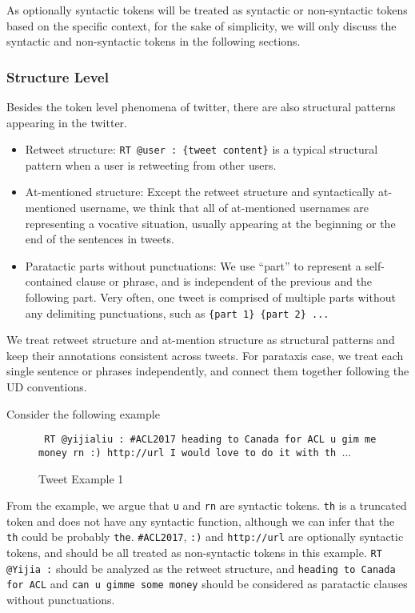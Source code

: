 \documentclass[11pt,letterpaper]{article}
\begin{document}
As optionally syntactic tokens will be treated as syntactic or non-syntactic tokens based on the specific context, for the sake of simplicity, we will only discuss the syntactic and non-syntactic tokens in the following sections.

	
\subsubsection{Structure Level}
Besides the token level phenomena of twitter, there are also structural patterns appearing in the twitter.

\begin{itemize}
\item Retweet structure: {\tt RT @user : \{tweet content\}} is a typical structural pattern when a user is retweeting from other users. 
\item At-mentioned structure: Except the retweet structure and syntactically at-mentioned username, we think that all of at-mentioned usernames are representing a vocative situation, usually appearing at the beginning or the end of the sentences in tweets.
\item Paratactic parts without punctuations: We use ``part'' to represent a self-contained clause or phrase, and is independent of the previous and the following part. Very often, one tweet is comprised of multiple parts without any delimiting punctuations, such as {\tt \{part 1\} \{part 2\} ...}
\end{itemize}

We treat retweet structure and at-mention structure as structural patterns and keep their annotations consistent across tweets. For parataxis case, we treat each single sentence or phrases independently, and connect them together following the UD conventions. 

Consider the following example

\begin{figure}[h]
\label{ex1}
\small
{\tt
RT @yijialiu : \#ACL2017 heading to Canada for ACL u gim me money rn :) http://url I would love to do it with th $\ldots$ %
}
\caption{Tweet Example 1}
\label{ex1}
\end{figure}

From the example, we argue that {\tt u} and {\tt rn} are syntactic tokens.
{\tt th} is a truncated token and does not have any syntactic function, although we can infer that the {\tt th} could be probably {\tt the}.
{\tt \#ACL2017}, {\tt :)} and {\tt http://url} are optionally syntactic tokens, and should be all treated as non-syntactic tokens in this example.
{\tt RT @Yijia :} should be analyzed as the retweet structure, and {\tt heading to Canada for ACL} and {\tt can u gimme some money} should be considered as paratactic clauses without punctuations.
\end{document}
